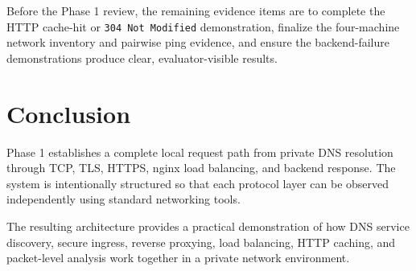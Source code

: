 \documentclass[11pt,a4paper]{article}
\begin{document}
Before the Phase 1 review, the remaining evidence items are to complete
the HTTP cache-hit or \texttt{304 Not Modified} demonstration, finalize
the four-machine network inventory and pairwise ping evidence, and ensure
the backend-failure demonstrations produce clear, evaluator-visible
results.

\section{Conclusion}

Phase 1 establishes a complete local request path from private DNS
resolution through TCP, TLS, HTTPS, nginx load balancing, and backend
response. The system is intentionally structured so that each protocol
layer can be observed independently using standard networking tools.

The resulting architecture provides a practical demonstration of how
DNS service discovery, secure ingress, reverse proxying, load balancing,
HTTP caching, and packet-level analysis work together in a private
network environment.
\end{document}
